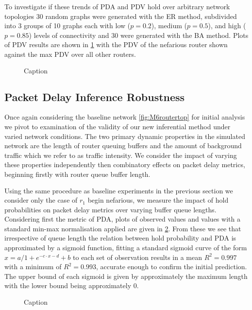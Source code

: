 To investigate if these trends of PDA and PDV hold over arbitrary network topologies 30 random graphs were generated with the ER method, subdivided into 3 groups of 10 graphs each with low ($p=0.2$), medium ($p=0.5$), and high ($p=0.85$) levels of connectivity and 30 were generated with the BA method. Plots of PDV results are shown in \cref{fig:Rrandgraphpdv} with the PDV of the nefarious router shown against the max PDV over all other routers.

\begin{figure}[H]
    \centering
    \caption{Caption}
    \label{fig:Rrandgraphpdv}
\end{figure}

\subsection{Packet Delay Inference Robustness}
Once again considering the baseline network \cref{fig:M6routertop} for initial analysis we pivot to examination of the validity of our new inferential method under varied network conditions. The two primary dynamic properties in the simulated network are the length of router queuing buffers and the amount of background traffic which we refer to as traffic intensity. We consider the impact of varying these properties independently then combinatory effects on packet delay metrics, beginning firstly with router queue buffer length.\par
Using the same procedure as baseline experiments in the previous section we consider only the case of $r_1$ begin nefarious, we measure the impact of hold probabilities on packet delay metrics over varying buffer queue lengths. Considering first the metric of PDA, plots of observed values and values with a standard min-max normalisation applied are given in \cref{fig:Rvariedqlenpda}. From these we see that irrespective of queue length the relation between hold probability and PDA is approximated by a sigmoid function, fitting a standard sigmoid curve of the form $x=a/1+e^{-c\cdot x-d} + b$ to each set of observation results in a mean $R^2=0.997$ with a minimum of $R^2=0.993$, accurate enough to confirm the initial prediction. The upper bound of each sigmoid is given by approximately the maximum length with the lower bound being approximately 0.\par
\begin{figure}[H]
    \centering
    \caption{Caption}
    \label{fig:Rvariedqlenpda}
\end{figure}
